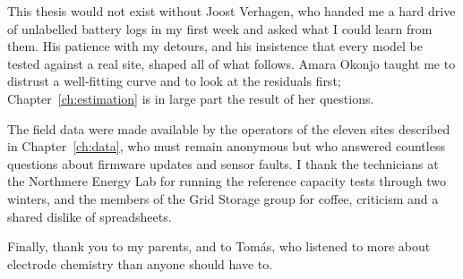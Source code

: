 
This thesis would not exist without Joost Verhagen, who handed me a hard
drive of unlabelled battery logs in my first week and asked what I could
learn from them. His patience with my detours, and his insistence that
every model be tested against a real site, shaped all of what follows.
Amara Okonjo taught me to distrust a well-fitting curve and to look at
the residuals first; Chapter~\ref{ch:estimation} is in large part the
result of her questions.

The field data were made available by the operators of the eleven sites
described in Chapter~\ref{ch:data}, who must remain anonymous but who
answered countless questions about firmware updates and sensor faults.
I thank the technicians at the Northmere Energy Lab for running the
reference capacity tests through two winters, and the members of the
Grid Storage group for coffee, criticism and a shared dislike of
spreadsheets.

Finally, thank you to my parents, and to Tomás, who listened to more
about electrode chemistry than anyone should have to.
